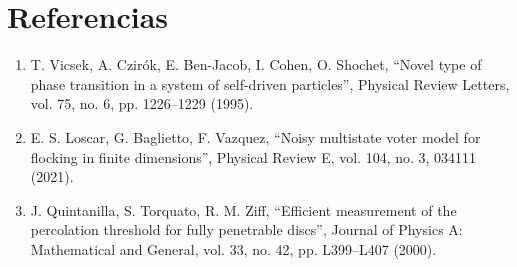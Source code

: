 \documentclass[11pt]{article}
\begin{document}
\section*{Referencias}

\begin{enumerate}
  \item[{[1]}] T. Vicsek, A. Czirók, E. Ben-Jacob, I. Cohen, O. Shochet,
    ``Novel type of phase transition in a system of self-driven particles'',
    Physical Review Letters, vol. 75, no. 6, pp. 1226--1229 (1995).
  \item[{[2]}] E. S. Loscar, G. Baglietto, F. Vazquez, ``Noisy multistate voter
    model for flocking in finite dimensions'', Physical Review E, vol. 104,
    no. 3, 034111 (2021).
  \item[{[3]}] J. Quintanilla, S. Torquato, R. M. Ziff, ``Efficient measurement
    of the percolation threshold for fully penetrable discs'', Journal of
    Physics A: Mathematical and General, vol. 33, no. 42, pp. L399--L407
    (2000).
\end{enumerate}
\end{document}
